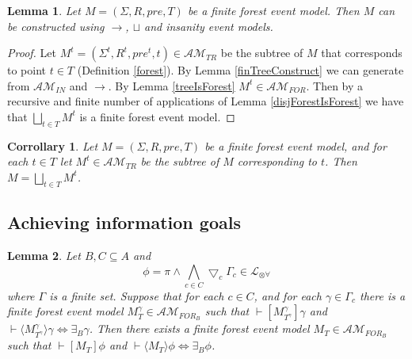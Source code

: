 \documentclass[12pt, a4paper, titlepage]{scrartcl}
\newtheorem{lemma}{Lemma}[subsection]
\newtheorem{corr}{Corrollary}[subsection]
\numberwithin{equation}{section}
\newcommand{\cover}{\bigtriangledown}
\newcommand{\sqex}[1]{[{#1}]}
\newcommand{\anex}[1]{\langle {#1} \rangle}
\newcommand{\lang}{\mathcal{L}}
\newcommand{\langArbAct}{\lang_{\otimes\forall}}
\newcommand{\eventClass}{\mathcal{AM}}
\newcommand{\insaneClass}{\eventClass_{IN}}
\newcommand{\treeClass}{\eventClass_{TR}}
\newcommand{\forestClass}{\eventClass_{FOR}}
\newcommand{\FIXME}{{\bf FIXME}}
\begin{document}
\begin{lemma} \label{forestCon}
Let $M = (\Sigma, R, pre, T)$ be a finite forest event model.
Then $M$ can be constructed using $\to$, $\sqcup$ and insanity event models.
\end{lemma}

\begin{proof}
Let $M^t = (\Sigma^t, R^t, pre^t, t) \in \treeClass$ be the
subtree of $M$ that corresponds to point $t \in T$ (Definition \ref{forest}).
By Lemma \ref{finTreeConstruct} we can generate from $\insaneClass$ and $\to$.
By Lemma \ref{treeIsForest} $M^t \in \forestClass$.
Then by a recursive and finite number of applications of Lemma
\ref{disjForestIsForest} we have that $\bigsqcup_{t \in T} M^t$ is a finite
forest event model.
\end{proof}

\begin{corr} \label{forestConCorr}
Let $M = (\Sigma, R, pre, T)$ be a finite forest event model, and for each $t \in T$ let $M^t \in
\treeClass$ be the subtree of $M$ corresponding to $t$.
Then $M = \bigsqcup_{t \in T} M^t$.
\end{corr}

\subsection{Achieving information goals}


\begin{lemma} \label{coverFormulaAchievementK}
Let $B, C \subseteq A$ and
\[
\phi = \pi \land \bigwedge_{c \in C} \cover_c \Gamma_c \in \langArbAct
\]
where $\Gamma$ is a finite set.
Suppose that for each $c \in C$, and for each $\gamma \in \Gamma_c$ there is a finite forest event
model $M^\gamma_T \in \forestClass_B$ such that
$\vdash \sqex{M^\gamma_{T^\gamma}} \gamma$ and $\vdash \anex{ M^\gamma_{T^\gamma} } \gamma \iff
\exists_B \gamma$.
Then there exists a finite forest event model $M_T \in \forestClass_B$ such that $\vdash \sqex{M_T}\phi$ and
$\vdash \anex{ M_T } \phi \iff \exists_B \phi$.
\end{lemma}
\end{document}
